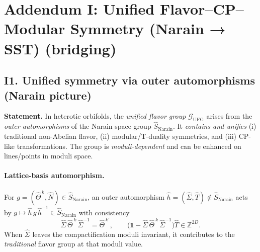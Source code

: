 \documentclass[11pt]{article}
\begin{document}
  \titlepageOpen

  \begin{abstract}


  \end{abstract}

  \titlepageClose
  \fi

  \ifdefined\standalonechapter
  \section{\papertitle}
  \else
  \fi




  \section*{Addendum I: Unified Flavor–CP–Modular Symmetry (Narain → SST) (bridging)}

      \subsection*{I1. Unified symmetry via outer automorphisms (Narain picture)}

          \textbf{Statement.} In heterotic orbifolds, the \emph{unified flavor group} $\mathcal G_{\mathrm{UFG}}$ arises from the \emph{outer automorphisms} of the Narain space group $\widehat S_{\mathrm{Narain}}$. It \emph{contains and unifies} (i) traditional non-Abelian flavor, (ii) modular/T-duality symmetries, and (iii) CP-like transformations. The group is \emph{moduli-dependent} and can be enhanced on lines/points in moduli space.

          \paragraph{Lattice-basis automorphism.}
              For $g=(\widehat\Theta^{\,k},\widehat N)\in\widehat S_{\mathrm{Narain}}$, an outer automorphism $\widehat h=(\widehat\Sigma,\widehat T)\notin\widehat S_{\mathrm{Narain}}$ acts by
              $g\mapsto \widehat h\,g\,\widehat h^{-1}\in\widehat S_{\mathrm{Narain}}$ with consistency
              \[
                  \widehat\Sigma\,\widehat\Theta^{\,k}\,\widehat\Sigma^{-1}=\widehat\Theta^{\,k'},
                  \qquad
                  \bigl(\mathbb 1-\widehat\Sigma\,\widehat\Theta^{\,k}\,\widehat\Sigma^{-1}\bigr)\widehat T\in\mathbb Z^{2D}.
              \]
              When $\widehat\Sigma$ leaves the compactification moduli invariant, it contributes to the \emph{traditional} flavor group at that moduli value.
\end{document}
